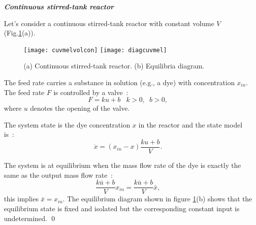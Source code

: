 \begin{exemple}{\bf{\em Continuous stirred-tank reactor}}

Let's consider a continuous stirred-tank reactor with constant volume $V$ (Fig.\ref{fig:diagcuvmel}(a)). 
\begin{figure}[ht] 
\begin{center}
\texttt{[image: cuvmelvolcon]}
\hspace{1cm}
\texttt{[image: diagcuvmel]}
\caption{(a) Continuous stirred-tank reactor. (b) Equilibria diagram.}
\label{fig:diagcuvmel}
\end{center} 
\end{figure}
The feed rate carries a substance in solution (e.g., a dye) with concentration $x_{in}$. The feed rate $F$ is controlled by a valve~:
$$F=k u+b\;\;\;k>0,\;\;b>0,$$
where $u$ denotes the opening of the valve.

The system state is the dye concentration $x$ in the reactor and the state model is~:
$$\dot x= (x_{in}-x)\frac{k u+b}{V}.$$

The system is at equilibrium when the mass flow rate of the dye is exactly the same as the output mass flow rate~:
$$\frac{k \bar u +b}{V}x_{in}=\frac{k \bar u +b}{V}\bar x,$$
this implies $\bar x =x_{in}$.
The equilibrium diagram shown in figure \ref{fig:diagcuvmel}(b) shows that the equilibrium state is fixed and isolated but the corresponding constant input is undetermined. \qed
\end{exemple}
\vv

